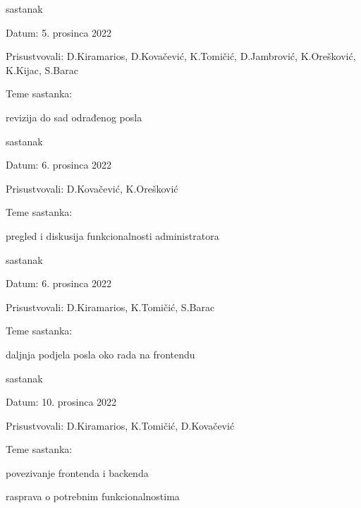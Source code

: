 \begin{packed_enum}
			\item  sastanak
			\item[] \begin{packed_item}
				\item Datum: 5. prosinca 2022
				\item Prisustvovali: D.Kiramarios, D.Kovačević, K.Tomičić, D.Jambrović, K.Orešković, K.Kijac, S.Barac
				\item Teme sastanka:
				\begin{packed_item}
					\item revizija do sad odrađenog posla
				\end{packed_item}
			\end{packed_item}

			\eject

			\item  sastanak
			\item[] \begin{packed_item}
				\item Datum: 6. prosinca 2022
				\item Prisustvovali: D.Kovačević, K.Orešković
				\item Teme sastanka:
				\begin{packed_item}
					\item pregled i diskusija funkcionalnosti administratora
				\end{packed_item}
			\end{packed_item}

			\item  sastanak
			\item[] \begin{packed_item}
				\item Datum: 6. prosinca 2022
				\item Prisustvovali: D.Kiramarios, K.Tomičić, S.Barac
				\item Teme sastanka:
				\begin{packed_item}
					\item daljnja podjela posla oko rada na frontendu
				\end{packed_item}
			\end{packed_item}

			\item  sastanak
			\item[] \begin{packed_item}
				\item Datum: 10. prosinca 2022
				\item Prisustvovali: D.Kiramarios, K.Tomičić, D.Kovačević
				\item Teme sastanka:
				\begin{packed_item}
					\item povezivanje frontenda i backenda
					\item rasprava o potrebnim funkcionalnostima
				\end{packed_item}
			\end{packed_item}


\end{packed_enum}
